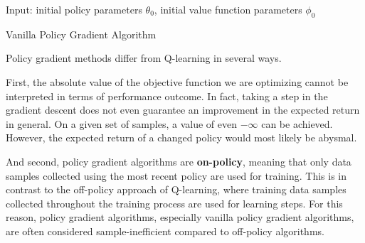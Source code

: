 \begin{algorithm}[H]
  Input: initial policy parameters $\theta_0$, initial value function parameters $\phi_0$
  
  
  \caption{Vanilla Policy Gradient Algorithm}
  \label{Vanilla}
\end{algorithm}

Policy gradient methods differ from Q-learning in several ways.

First, the absolute value of the objective function we are optimizing cannot be interpreted in terms of performance outcome.
In fact, taking a step in the gradient descent does not even guarantee an improvement in the expected return in general.
On a given set of samples, a value of even $-\infty$ can be achieved. 
However, the expected return of a changed policy would most likely be abysmal.

And second, policy gradient algorithms are \textbf{on-policy}, meaning that only data samples collected using the most recent policy are used for training.
This is in contrast to the off-policy approach of Q-learning, where training data samples collected throughout the training process are used for learning steps.
For this reason, policy gradient algorithms, especially vanilla policy gradient algorithms, are often considered sample-inefficient compared to off-policy algorithms.

